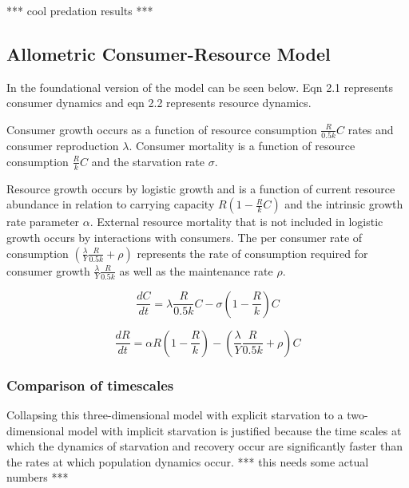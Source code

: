 \documentclass[]{rsos}%
\begin{document}
*** cool predation results ***




\subsection{Allometric Consumer-Resource Model}

In the foundational version of the model can be seen below. Eqn 2.1 represents consumer dynamics and eqn 2.2 represents resource dynamics.  

Consumer growth occurs as a function of resource consumption $\frac{R}{0.5k}C$ rates and consumer reproduction $\lambda$. Consumer mortality is a function of resource consumption  $\frac{R}{k}C$ and the starvation rate $\sigma$.

Resource growth occurs by logistic growth and is a function of current resource abundance in relation to carrying capacity  $R(1-\frac{R}{k}C)$ and the intrinsic growth rate parameter $\alpha$. External resource mortality that is not included in logistic growth occurs by interactions with consumers. The per consumer rate of consumption $(\frac{\lambda}{Y}\frac{R}{0.5k} + \rho)$ represents the rate of consumption required for consumer growth $\frac{\lambda}{Y}\frac{R}{0.5k}$ as well as the maintenance rate $\rho$.
\vspace{0.5cm}





\begin{equation}
    \frac{dC}{dt}= \lambda\frac{R}{0.5k}C- \sigma(1 - \frac{R}{k})C
\end{equation}

\begin{equation}
    \frac{dR}{dt} = \alpha R(1 - \frac{R}{k}) - (\frac{\lambda}{Y}\frac{R}{0.5k} + \rho)C
\end{equation}

\vspace{0.5cm}

\subsubsection{Comparison of timescales}
Collapsing this three-dimensional model with explicit starvation to a two-dimensional model with implicit starvation is justified because the time scales at which the dynamics of starvation and recovery occur are significantly faster than the rates at which population dynamics occur. 
*** this needs some actual numbers ***
\end{document}
